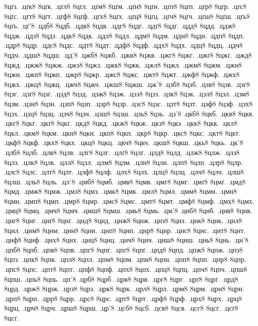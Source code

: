 {8цґз.
.цґк8
8цґк.
.цґл8
8цґл.
.цґм8
8цґм.
.цґн8
8цґн.
.цґп8
8цґп.
.цґр8
8цґр.
.цґс8
8цґс.
.цґт8
8цґт.
.цґф8
8цґф.
.цґх8
8цґх.
.цґц8
8цґц.
.цґч8
8цґч.
.цґш8
8цґш.
.цґь8
8цґь.
.цґ'8
.цдб8
8цдб.
.цдв8
8цдв.
.цдг8
8цдг.
.цдґ8
8цдґ.
.цдд8
8цдд.
.цдж8
8цдж.
.цдз8
8цдз.
.цдк8
8цдк.
.цдл8
8цдл.
.цдм8
8цдм.
.цдн8
8цдн.
.цдп8
8цдп.
.цдр8
8цдр.
.цдс8
8цдс.
.цдт8
8цдт.
.цдф8
8цдф.
.цдх8
8цдх.
.цдц8
8цдц.
.цдч8
8цдч.
.цдш8
8цдш.
.цд'8
.цжб8
8цжб.
.цжв8
8цжв.
.цжг8
8цжг.
.цжґ8
8цжґ.
.цжд8
8цжд.
.цжж8
8цжж.
.цжз8
8цжз.
.цжк8
8цжк.
.цжл8
8цжл.
.цжм8
8цжм.
.цжн8
8цжн.
.цжп8
8цжп.
.цжр8
8цжр.
.цжс8
8цжс.
.цжт8
8цжт.
.цжф8
8цжф.
.цжх8
8цжх.
.цжц8
8цжц.
.цжч8
8цжч.
.цжш8
8цжш.
.цж'8
.цзб8
8цзб.
.цзв8
8цзв.
.цзг8
8цзг.
.цзґ8
8цзґ.
.цзд8
8цзд.
.цзж8
8цзж.
.цзз8
8цзз.
.цзк8
8цзк.
.цзл8
8цзл.
.цзм8
8цзм.
.цзн8
8цзн.
.цзп8
8цзп.
.цзр8
8цзр.
.цзс8
8цзс.
.цзт8
8цзт.
.цзф8
8цзф.
.цзх8
8цзх.
.цзц8
8цзц.
.цзч8
8цзч.
.цзш8
8цзш.
.цзь8
8цзь.
.цз'8
.цкб8
8цкб.
.цкв8
8цкв.
.цкг8
8цкг.
.цкґ8
8цкґ.
.цкд8
8цкд.
.цкж8
8цкж.
.цкз8
8цкз.
.цкк8
8цкк.
.цкл8
8цкл.
.цкм8
8цкм.
.цкн8
8цкн.
.цкп8
8цкп.
.цкр8
8цкр.
.цкс8
8цкс.
.цкт8
8цкт.
.цкф8
8цкф.
.цкх8
8цкх.
.цкц8
8цкц.
.цкч8
8цкч.
.цкш8
8цкш.
.цкь8
8цкь.
.цк'8
.цлб8
8цлб.
.цлв8
8цлв.
.цлг8
8цлг.
.цлґ8
8цлґ.
.цлд8
8цлд.
.цлж8
8цлж.
.цлз8
8цлз.
.цлк8
8цлк.
.цлл8
8цлл.
.цлм8
8цлм.
.цлн8
8цлн.
.цлп8
8цлп.
.цлр8
8цлр.
.цлс8
8цлс.
.цлт8
8цлт.
.цлф8
8цлф.
.цлх8
8цлх.
.цлц8
8цлц.
.цлч8
8цлч.
.цлш8
8цлш.
.цль8
8цль.
.цл'8
.цмб8
8цмб.
.цмв8
8цмв.
.цмг8
8цмг.
.цмґ8
8цмґ.
.цмд8
8цмд.
.цмж8
8цмж.
.цмз8
8цмз.
.цмк8
8цмк.
.цмл8
8цмл.
.цмм8
8цмм.
.цмн8
8цмн.
.цмп8
8цмп.
.цмр8
8цмр.
.цмс8
8цмс.
.цмт8
8цмт.
.цмф8
8цмф.
.цмх8
8цмх.
.цмц8
8цмц.
.цмч8
8цмч.
.цмш8
8цмш.
.цмь8
8цмь.
.цм'8
.цнб8
8цнб.
.цнв8
8цнв.
.цнг8
8цнг.
.цнґ8
8цнґ.
.цнд8
8цнд.
.цнж8
8цнж.
.цнз8
8цнз.
.цнк8
8цнк.
.цнл8
8цнл.
.цнм8
8цнм.
.цнн8
8цнн.
.цнп8
8цнп.
.цнр8
8цнр.
.цнс8
8цнс.
.цнт8
8цнт.
.цнф8
8цнф.
.цнх8
8цнх.
.цнц8
8цнц.
.цнч8
8цнч.
.цнш8
8цнш.
.цнь8
8цнь.
.цн'8
.цпб8
8цпб.
.цпв8
8цпв.
.цпг8
8цпг.
.цпґ8
8цпґ.
.цпд8
8цпд.
.цпж8
8цпж.
.цпз8
8цпз.
.цпк8
8цпк.
.цпл8
8цпл.
.цпм8
8цпм.
.цпн8
8цпн.
.цпп8
8цпп.
.цпр8
8цпр.
.цпс8
8цпс.
.цпт8
8цпт.
.цпф8
8цпф.
.цпх8
8цпх.
.цпц8
8цпц.
.цпч8
8цпч.
.цпш8
8цпш.
.цпь8
8цпь.
.цп'8
.црб8
8црб.
.црв8
8црв.
.црг8
8црг.
.црґ8
8црґ.
.црд8
8црд.
.црж8
8црж.
.црз8
8црз.
.црк8
8црк.
.црл8
8црл.
.црм8
8црм.
.црн8
8црн.
.црп8
8црп.
.црр8
8црр.
.црс8
8црс.
.црт8
8црт.
.црф8
8црф.
.црх8
8црх.
.црц8
8црц.
.црч8
8црч.
.црш8
8црш.
.цр'8
.цсб8
8цсб.
.цсв8
8цсв.
.цсг8
8цсг.
.цсґ8
8цсґ.
}
